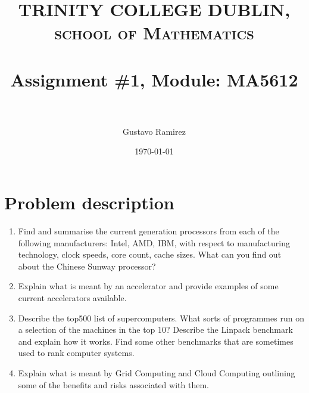 \documentclass[paper=a4, fontsize=11pt]{scrartcl} %
\title{	
\normalfont \normalsize 
\textsc{TRINITY COLLEGE DUBLIN, school of Mathematics} \\ [25pt] %
\horrule{0.5pt} \\[0.4cm] %
\huge Assignment \#1, Module: MA5612 \\ %
\horrule{2pt} \\[0.5cm] %
}
\author{Gustavo Ramirez} %
\date{\normalsize\today} %
\numberwithin{equation}{section} %
\numberwithin{figure}{section} %
\numberwithin{table}{section} %
\begin{document}
\maketitle %


\section{Problem description}

\begin{enumerate}
\item Find and summarise the current generation processors from each of the following manufacturers: Intel, AMD, IBM, with respect to manufacturing technology, clock speeds, core count, cache sizes. What can you find out about the Chinese Sunway processor?
\item Explain what is meant by an accelerator and provide examples of some current accelerators available.
\item Describe the top500 list of supercomputers. What sorts of programmes run on a selection of the machines in the top 10? Describe the Linpack benchmark and explain how it works. Find some other benchmarks that are sometimes used to rank computer systems.
\item Explain what is meant by Grid Computing and Cloud Computing outlining some of the benefits and risks associated with them.
\end{enumerate}

\newpage


\begin{comment}

USEFUL LINKS:

official sources for terminology:
-----
http://www.intel.com/content/www/us/en/support/topics/glossary.html
https://www-01.ibm.com/software/globalization/terminology/a.html
-----




about IMB processors:
-----

insert in google: list of ibm processors
https://en.wikipedia.org/wiki/List_of_IBM_products
https://www-01.ibm.com/software/passportadvantage/guide_to_identifying_processor_family.html
http://www.nextplatform.com/2015/08/10/ibm-roadmap-extends-power-chips-to-2020-and-beyond/
http://www.theverge.com/2015/7/9/8919091/ibm-7nm-transistor-processor
https://www.ibm.com/developerworks/ibmi/library/i-ibmi-7_2-and-ibm-power8/
-----




\end{comment}
\end{document}
